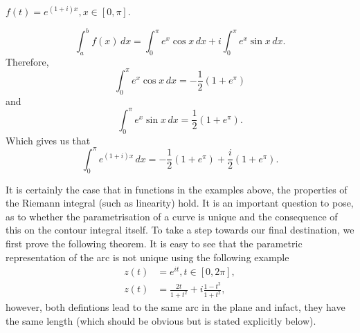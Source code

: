 \documentclass[12pt]{book}
\begin{document}
\begin{exmp}
    $f(t) = e^{(1 + i)x}, x \in [0, \pi].$
\end{exmp}
\[
    \int_{a}^{b} f(x)\,dx = \int_{0}^{\pi} e^{x}\cos x\,dx + i\int_{0}^{\pi} e^{x}\sin x\,dx.
\]
Therefore,
\[
    \int_{0}^{\pi} e^{x}\cos x\,dx = -\frac{1}{2}(1 + e^{\pi})
\]
and
\[
    \int_{0}^{\pi} e^{x}\sin x\,dx = \frac{1}{2}(1 + e^{\pi}).
\]
Which gives us that 
\[
    \int_{0}^{\pi} e^{(1 + i)x}\,dx = -\frac{1}{2}(1 + e^{\pi}) + \frac{i}{2}(1 + e^{\pi}).
\]

It is certainly the case that in functions in the examples above, the properties of the Riemann integral (such as linearity) hold. It is an important question to pose, as to whether the parametrisation of a curve is unique and the consequence of this on the contour integral itself. To take a step towards our final destination, we first prove the following theorem. It is easy to see that the parametric representation of the arc is not unique using the following example
\begin{align*}
    z(t) &= e^{it}, t \in [0, 2\pi], \\
    z(t) &= \frac{2t}{1 + t^2} + i\frac{1 - t^2}{1 + t^2},
\end{align*}
however, both defintions lead to the same arc in the plane and infact, they have the same length (which should be obvious but is stated explicitly below).
\end{document}
